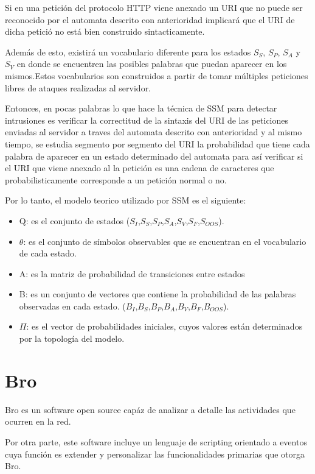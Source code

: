 Si en una petici\'on del protocolo HTTP viene anexado un URI que no puede ser reconocido por el automata descrito con anterioridad implicar\'a que el URI de dicha petici\'o no est\'a bien construido sintacticamente.

Adem\'as de esto, existir\'a un vocabulario diferente para los estados $S_{S}$, $S_{P}$, $S_{A}$ y $S_{V}$ en donde se encuentren las posibles palabras que puedan aparecer en los mismos.Estos vocabularios son construidos a partir de tomar m\'ultiples peticiones libres de ataques realizadas al servidor. 

Entonces, en pocas palabras lo que hace la t\'ecnica de SSM para detectar intrusiones es verificar la correctitud de la sintaxis del URI de las peticiones enviadas al servidor a traves del automata descrito con anterioridad y al mismo tiempo, se estudia segmento por segmento del URI la probabilidad que tiene cada palabra de aparecer en un estado determinado del automata para as\'i verificar si el URI que viene anexado al la petici\'on es una cadena de caracteres que probabilisticamente corresponde a un petici\'on normal o no.

Por lo tanto, el modelo teorico utilizado por SSM es el siguiente:

\begin{itemize}
\item Q: es el conjunto de estados ($S_{I}$,$S_{S}$,$S_{P}$,$S_{A}$,$S_{V}$,$S_{F}$,$S_{OOS}$).
\item $\theta$: es el conjunto de s\'imbolos observables que se encuentran en el vocabulario de cada estado.
\item A: es la matriz de probabilidad de transiciones entre estados
\item B: es un conjunto de vectores que contiene la probabilidad de las palabras observadas en cada estado. ($B_{I}$,$B_{S}$,$B_{P}$,$B_{A}$,$B_{V}$,$B_{F}$,$B_{OOS}$).
\item $\Pi$: es el vector de probabilidades iniciales, cuyos valores est\'an determinados por la topolog\'ia del modelo. 
\end{itemize}

\section{Bro}

Bro es un software open source cap\'az de analizar a detalle las actividades que ocurren en la red.

Por otra parte, este software incluye un lenguaje de scripting orientado a eventos cuya funci\'on es extender y personalizar las funcionalidades primarias que otorga Bro. 

